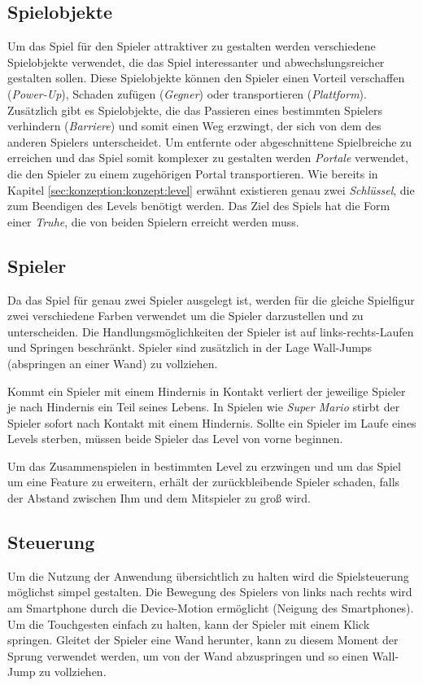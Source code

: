 \subsection{Spielobjekte}
\label{sec:konzeption:konzept:spielobjekte}
Um das Spiel für den Spieler attraktiver zu gestalten werden verschiedene Spielobjekte verwendet, die das Spiel interessanter und abwechslungsreicher gestalten sollen. Diese Spielobjekte können den Spieler einen Vorteil verschaffen (\textit{Power-Up}), Schaden zufügen (\textit{Gegner}) oder transportieren (\textit{Plattform}). Zusätzlich gibt es Spielobjekte, die das Passieren eines bestimmten Spielers verhindern (\textit{Barriere}) und somit einen Weg erzwingt, der sich von dem des anderen Spielers unterscheidet. Um entfernte oder abgeschnittene Spielbreiche zu erreichen und das Spiel somit komplexer zu gestalten werden \textit{Portale} verwendet, die den Spieler zu einem zugehörigen Portal transportieren. Wie bereits in Kapitel \ref{sec:konzeption:konzept:level} erwähnt existieren genau zwei \textit{Schlüssel}, die zum Beendigen des Levels benötigt werden. Das Ziel des Spiels hat die Form einer \textit{Truhe}, die von beiden Spielern erreicht werden muss.

\subsection{Spieler}
\label{sec:konzeption:konzept:spieler}
Da das Spiel für genau zwei Spieler ausgelegt ist, werden für die gleiche Spielfigur zwei verschiedene Farben verwendet um die Spieler darzustellen und zu unterscheiden. Die Handlungsmöglichkeiten der Spieler ist auf links-rechts-Laufen und Springen beschränkt. Spieler sind zusätzlich in der Lage Wall-Jumps (abspringen an einer Wand) zu vollziehen.

Kommt ein Spieler mit einem Hindernis in Kontakt verliert der jeweilige Spieler je nach Hindernis ein Teil seines Lebens. In Spielen wie \textit{Super Mario} stirbt der Spieler sofort nach Kontakt mit einem Hindernis. Sollte ein Spieler im Laufe eines Levels sterben, müssen beide Spieler das Level von vorne beginnen.

Um das Zusammenspielen in bestimmten Level zu erzwingen und um das Spiel um eine Feature zu erweitern, erhält der zurückbleibende Spieler schaden, falls der Abstand zwischen Ihm und dem Mitspieler zu groß wird.

\subsection{Steuerung}
\label{sec:konzeption:konzept:steuerung}
Um die Nutzung der Anwendung übersichtlich zu halten wird die Spielsteuerung möglichst simpel gestalten. Die Bewegung des Spielers von links nach rechts wird am Smartphone durch die Device-Motion ermöglicht (Neigung des Smartphones). Um die Touchgesten einfach zu halten, kann der Spieler mit einem Klick springen. Gleitet der Spieler eine Wand herunter, kann zu diesem Moment der Sprung verwendet werden, um von der Wand abzuspringen und so einen Wall-Jump zu vollziehen. 

